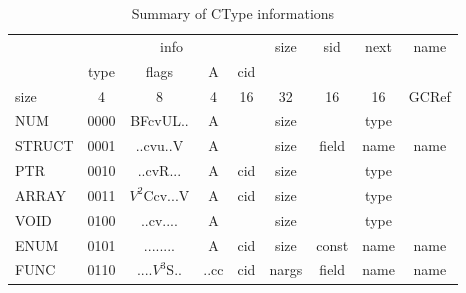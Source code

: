\begin{table}[p]
\footnotesize
\centering
\caption{Summary of CType informations}
\label{tab:ffi-ctype}
\begin{tabular}{l|c|c|c|c|c|l|c|c|c|c|}
\cline{2-11}
                               & \multicolumn{6}{c|}{info}                                                         & \multirow{2}{*}{size} & \multirow{2}{*}{sid} & \multirow{2}{*}{next} & \multirow{2}{*}{name} \\ \cline{2-7}
                               & type & \multicolumn{2}{c|}{flags}          & A         & \multicolumn{2}{c|}{cid} &                       &                      &                       &                       \\ \hline
\multicolumn{1}{|l|}{size}     & 4    & \multicolumn{2}{c|}{8}              & 4         & \multicolumn{2}{c|}{16}  & 32                    & 16                   & 16                    & GCRef                 \\ \hline
\multicolumn{1}{|l|}{NUM}      & 0000 & \multicolumn{2}{c|}{BFcvUL..}       & A         & \multicolumn{2}{c|}{}    & size                  &                      & type                  &                       \\
\multicolumn{1}{|l|}{STRUCT}   & 0001 & \multicolumn{2}{c|}{..cvu..V}       & A         & \multicolumn{2}{c|}{}    & size                  & field                & name                  & name                  \\
\multicolumn{1}{|l|}{PTR}      & 0010 & \multicolumn{2}{c|}{..cvR...}       & A         & \multicolumn{2}{c|}{cid} & size                  &                      & type                  &                       \\
\multicolumn{1}{|l|}{ARRAY}    & 0011 & \multicolumn{2}{c|}{$V^2$Ccv...V}   & A         & \multicolumn{2}{c|}{cid} & size                  &                      & type                  &                       \\
\multicolumn{1}{|l|}{VOID}     & 0100 & \multicolumn{2}{c|}{..cv....}       & A         & \multicolumn{2}{c|}{}    & size                  &                      & type                  &                       \\
\multicolumn{1}{|l|}{ENUM}     & 0101 & \multicolumn{2}{c|}{........}       & A         & \multicolumn{2}{c|}{cid} & size                  & const                & name                  & name                  \\
\multicolumn{1}{|l|}{FUNC}     & 0110 & \multicolumn{2}{c|}{....$V^3$S..}   & ..cc      & \multicolumn{2}{c|}{cid} & nargs                 & field                & name                  & name                  \\

\end{tabular}
\end{table}
